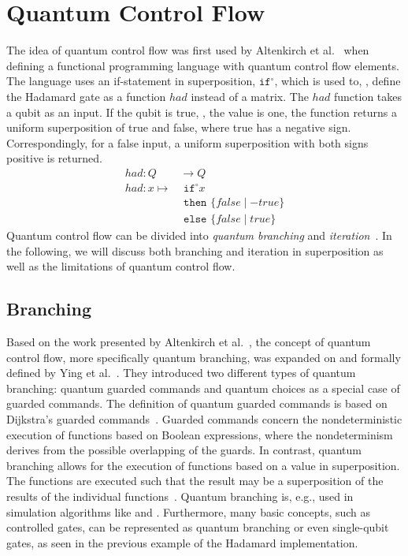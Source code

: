 \section{Quantum Control Flow}
\label{sec:background_quantumControlFlow}
The idea of quantum control flow was first used by Altenkirch et al.~\cite{AlGr05} when defining a functional programming language with quantum control flow elements. The language uses an if-statement in superposition, $\texttt{if}^\circ$, which is used to, \eg, define the Hadamard gate as a function $had$ instead of a matrix. The $had$ function takes a qubit as an input. If the qubit is true, \ie, the value is one, the function returns a uniform superposition of true and false, where true has a negative sign. Correspondingly, for a false input, a uniform superposition with both signs positive is returned.
\begin{align*}
    had : Q& \to Q\\
    had : x \mapsto& \texttt{ if}^\circ x\\
                   & \texttt{ then } \{false \mid -true\}\\
                   & \texttt{ else } \{false \mid true\}
\end{align*}
Quantum control flow can be divided into \emph{quantum branching} and \emph{iteration}~\cite{YVC24}. In the following, we will discuss both branching and iteration in superposition as well as the limitations of quantum control flow. 

\subsection{Branching}
\label{sec:background_branching}
Based on the work presented by Altenkirch et al.~\cite{AlGr05}, the concept of quantum control flow, more specifically quantum branching, was expanded on and formally defined by Ying et al.~\cite{YYF12}. They introduced two different types of quantum branching: quantum guarded commands and quantum choices as a special case of guarded commands. The definition of quantum guarded commands is based on Dijkstra's guarded commands~\cite{Dijk75}. Guarded commands concern the nondeterministic execution of functions based on Boolean expressions, where the nondeterminism derives from the possible overlapping of the guards. In contrast, quantum branching allows for the execution of functions based on a value in superposition. The functions are executed such that the result may be a superposition of the results of the individual functions~\cite{YVC24}.
Quantum branching is, e.g., used in simulation algorithms like \cite{BGB*18} and \cite{LoCh19}. Furthermore, many basic concepts, such as controlled gates, can be represented as quantum branching or even single-qubit gates, as seen in the previous example of the Hadamard implementation.

